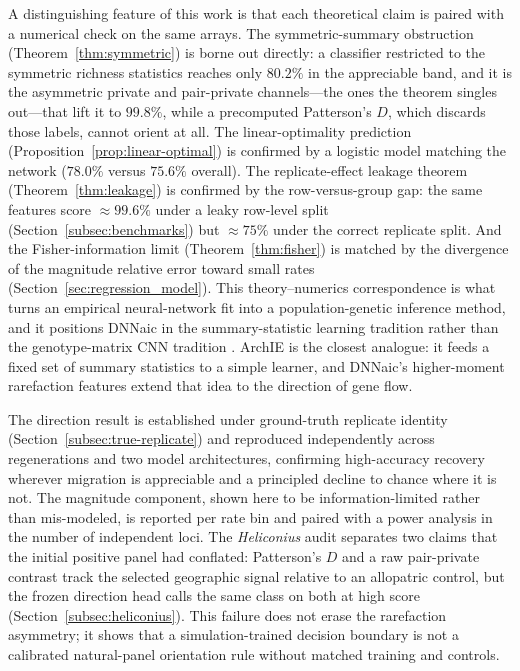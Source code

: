 \documentclass[11pt]{article}
\theoremstyle{plain}
\theoremstyle{definition}
\theoremstyle{remark}
\begin{document}
A distinguishing feature of this work is that each theoretical claim is paired with a numerical
check on the same arrays. The symmetric-summary obstruction (Theorem~\ref{thm:symmetric}) is borne
out directly: a classifier restricted to the symmetric richness statistics reaches only $80.2\%$ in
the appreciable band, and it is the asymmetric private and pair-private channels---the ones the
theorem singles out---that lift it to $99.8\%$, while a precomputed Patterson's $D$, which discards
those labels, cannot orient at all. The linear-optimality prediction
(Proposition~\ref{prop:linear-optimal}) is confirmed by a logistic model matching the network
($78.0\%$ versus $75.6\%$ overall). The replicate-effect leakage theorem (Theorem~\ref{thm:leakage})
is confirmed by the row-versus-group gap: the same features score $\approx99.6\%$ under a leaky
row-level split (Section~\ref{subsec:benchmarks}) but $\approx75\%$ under the correct replicate
split. And the Fisher-information limit (Theorem~\ref{thm:fisher}) is matched by the divergence of
the magnitude relative error toward small rates (Section~\ref{sec:regression_model}). This
theory--numerics correspondence is what turns an empirical neural-network fit into a
population-genetic inference method, and it positions DNNaic in the summary-statistic learning
tradition
\citep{sheehan2016deep,durvasula2019archie} rather than the genotype-matrix CNN tradition
\citep{gower2021genomatnn,ray2024introunet,flagel2019unreasonable,chan2018likelihood}.  ArchIE
\citep{durvasula2019archie} is the closest analogue: it feeds a fixed set of summary statistics
to a simple learner, and DNNaic's higher-moment rarefaction features extend that idea to the direction
of gene flow.

The direction result is established under ground-truth replicate identity
(Section~\ref{subsec:true-replicate}) and reproduced independently across regenerations and two
model architectures, confirming high-accuracy recovery wherever migration is appreciable and a
principled decline to chance where it is not. The magnitude component, shown here to be
information-limited rather than mis-modeled, is reported per rate bin and paired with a power
analysis in the number of independent loci. The \textit{Heliconius} audit separates two claims that
the initial positive panel had conflated: Patterson's $D$ and a raw pair-private contrast track the
selected geographic signal relative to an allopatric control, but the frozen direction head calls
the same class on both at high score (Section~\ref{subsec:heliconius}). This failure does not erase
the rarefaction asymmetry; it shows that a simulation-trained decision boundary is not a calibrated
natural-panel orientation rule without matched training and controls.
\end{document}
